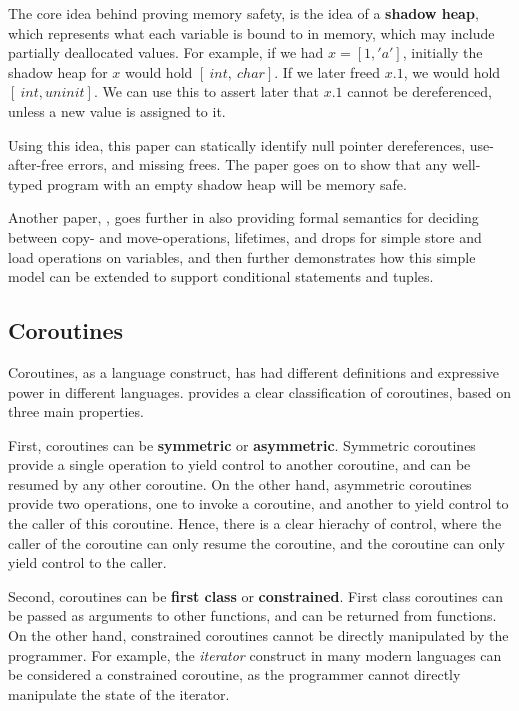 \documentclass[review,twocolumn]{sigplanconf}
\begin{document}
The core idea behind proving memory safety, is the idea of a \textbf{shadow heap}, which represents what each variable is bound to in memory, which may include partially deallocated values. For example, if we had $x = [1, 'a']$, initially the shadow heap for $x$ would hold $[~int, ~char]$. If we later freed $x.1$, we would hold $[~int, uninit]$. We can use this to assert later that $x.1$ cannot be dereferenced, unless a new value is assigned to it.

Using this idea, this paper can statically identify null pointer dereferences, use-after-free errors, and missing frees. The paper goes on to show that any well-typed program with an empty shadow heap will be memory safe.

Another paper, \citet{pearce2021}, goes further in also providing formal semantics for deciding between copy- and move-operations, lifetimes, and drops for simple store and load operations on variables, and then further demonstrates how this simple model can be extended to support conditional statements and tuples.


\subsection{Coroutines}

Coroutines, as a language construct, has had different definitions and expressive power in different languages. \citet{moura2009} provides a clear classification of coroutines, based on three main properties.

First, coroutines can be \textbf{symmetric} or \textbf{asymmetric}. Symmetric coroutines provide a single operation to yield control to another coroutine, and can be resumed by any other coroutine. On the other hand, asymmetric coroutines provide two operations, one to invoke a coroutine, and another to yield control to the caller of this coroutine. Hence, there is a clear hierachy of control, where the caller of the coroutine can only resume the coroutine, and the coroutine can only yield control to the caller.

Second, coroutines can be \textbf{first class} or \textbf{constrained}. First class coroutines can be passed as arguments to other functions, and can be returned from functions. On the other hand, constrained coroutines cannot be directly manipulated by the programmer. For example, the \textit{iterator} construct in many modern languages can be considered a constrained coroutine, as the programmer cannot directly manipulate the state of the iterator.
\end{document}
